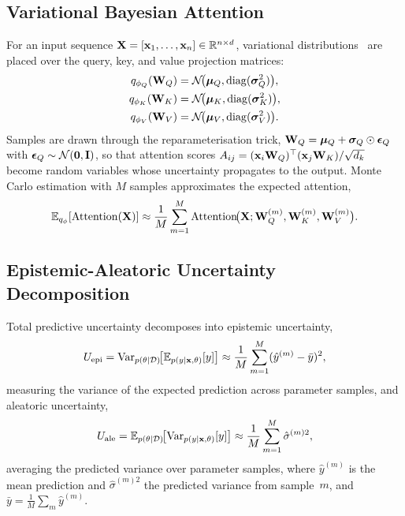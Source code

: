 \subsection{Variational Bayesian Attention}

For an input sequence $\mathbf{X}=[\mathbf{x}_1,\dots,\mathbf{x}_n]\in\mathbb{R}^{n\times d}$, variational distributions~\cite{Blundell2015} are placed over the query, key, and value projection matrices:
\begin{align}
q_{\phi_Q}(\mathbf{W}_Q) &= \mathcal{N}\!\bigl(\bm{\mu}_Q,\mathrm{diag}(\bm{\sigma}_Q^2)\bigr), \notag\\
q_{\phi_K}(\mathbf{W}_K) &= \mathcal{N}\!\bigl(\bm{\mu}_K,\mathrm{diag}(\bm{\sigma}_K^2)\bigr), \notag\\
q_{\phi_V}(\mathbf{W}_V) &= \mathcal{N}\!\bigl(\bm{\mu}_V,\mathrm{diag}(\bm{\sigma}_V^2)\bigr).
\label{eq:stoch_var_attn}
\end{align}
Samples are drawn through the reparameterisation trick, $\mathbf{W}_Q=\bm{\mu}_Q+\bm{\sigma}_Q\odot\bm{\epsilon}_Q$ with $\bm{\epsilon}_Q\sim\mathcal{N}(\mathbf{0},\mathbf{I})$, so that attention scores $A_{ij}=(\mathbf{x}_i\mathbf{W}_Q)^\top(\mathbf{x}_j\mathbf{W}_K)/\sqrt{d_k}$ become random variables whose uncertainty propagates to the output. Monte Carlo estimation with $M$ samples approximates the expected attention,
\begin{equation}
\mathbb{E}_{q_\phi}[\mathrm{Attention}(\mathbf{X})]
\approx \frac{1}{M}\sum_{m=1}^{M}
  \mathrm{Attention}\!\bigl(\mathbf{X};\mathbf{W}_Q^{(m)},\mathbf{W}_K^{(m)},\mathbf{W}_V^{(m)}\bigr).
\label{eq:stoch_mc_attn}
\end{equation}

\subsection{Epistemic-Aleatoric Uncertainty Decomposition}

Total predictive uncertainty decomposes into epistemic uncertainty,
\begin{equation}
U_{\mathrm{epi}}
= \mathrm{Var}_{p(\theta|\mathcal{D})}\!\bigl[\mathbb{E}_{p(y|\mathbf{x},\theta)}[y]\bigr]
\approx \frac{1}{M}\sum_{m=1}^{M}(\hat{y}^{(m)}-\bar{y})^2,
\label{eq:stoch_epi}
\end{equation}
measuring the variance of the expected prediction across parameter samples, and aleatoric uncertainty,
\begin{equation}
U_{\mathrm{ale}}
= \mathbb{E}_{p(\theta|\mathcal{D})}\!\bigl[\mathrm{Var}_{p(y|\mathbf{x},\theta)}[y]\bigr]
\approx \frac{1}{M}\sum_{m=1}^{M}\hat{\sigma}^{(m)2},
\label{eq:stoch_ale}
\end{equation}
averaging the predicted variance over parameter samples, where $\hat{y}^{(m)}$ is the mean prediction and $\hat{\sigma}^{(m)2}$ the predicted variance from sample~$m$, and $\bar{y}=\frac{1}{M}\sum_m\hat{y}^{(m)}$.

